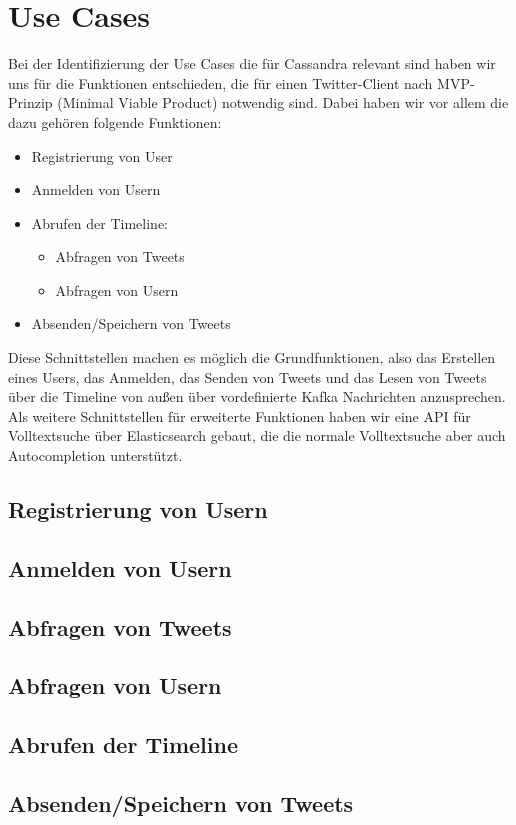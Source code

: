 \section{Use Cases}
\label{sec:usecase}
Bei der Identifizierung der Use Cases die für Cassandra relevant sind haben wir uns für die Funktionen entschieden, die für einen Twitter-Client nach MVP-Prinzip (Minimal Viable Product) notwendig sind. Dabei haben wir vor allem die dazu gehören folgende Funktionen:
\begin{itemize}
	\item Registrierung von User
	\item Anmelden von Usern
	\item Abrufen der Timeline:
		\begin{itemize}
			\item Abfragen von Tweets
			\item Abfragen von Usern
		\end{itemize}
	\item Absenden/Speichern von Tweets
\end{itemize}
Diese Schnittstellen machen es möglich die Grundfunktionen, also das Erstellen eines Users, das Anmelden, das Senden von Tweets und das Lesen von Tweets über die Timeline von außen über vordefinierte Kafka Nachrichten anzusprechen.
Als weitere Schnittstellen für erweiterte Funktionen haben wir eine API für Volltextsuche über Elasticsearch gebaut, die die normale Volltextsuche aber auch Autocompletion unterstützt.\\ 




\subsection{Registrierung von Usern}

\subsection{Anmelden von Usern}

\subsection{Abfragen von Tweets}

\subsection{Abfragen von Usern}

\subsection{Abrufen der Timeline}

\subsection{Absenden/Speichern von Tweets}


